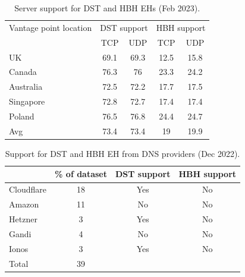 \documentclass[conference]{IEEEtran}
\begin{document}
\begin{table} 
\centering
\caption{Server support for DST and HBH EHs (Feb 2023). }
\begin{tabular}{p{1.5cm}|cc|cc}
\multicolumn{1}{l|}{\centering Vantage point location} & \multicolumn{2}{p{2cm}|}{\centering DST support} 
                      & \multicolumn{2}{p{2cm}}{\centering HBH support} \\ \cline{2-5} 
\multicolumn{1}{l|}{} & \multicolumn{1}{c|}{TCP}   & UDP      & \multicolumn{1}{c|}{TCP}     & UDP   \\ \hline \hline
UK                    & \multicolumn{1}{c|}{69.1}  & 69.3     & \multicolumn{1}{c|}{12.5}    & 15.8  \\ \hline
Canada                & \multicolumn{1}{c|}{76.3}  & 76       & \multicolumn{1}{c|}{23.3}    & 24.2  \\ \hline
Australia             & \multicolumn{1}{c|}{72.5}  & 72.2     & \multicolumn{1}{c|}{17.7}    & 17.5  \\ \hline
Singapore             & \multicolumn{1}{c|}{72.8}  & 72.7     & \multicolumn{1}{c|}{17.4}    & 17.4  \\ \hline
Poland                & \multicolumn{1}{c|}{76.5}  & 76.8     & \multicolumn{1}{c|}{24.4}    & 24.7   \\ \hline
\hline
Avg                & \multicolumn{1}{c|}{73.4}  & 73.4     & \multicolumn{1}{c|}{19}    & 19.9   

\end{tabular}
\label{tbl:e2e_traversal}
\end{table}


\begin{table} 
\centering
\caption{Support for DST and HBH EH from DNS providers (Dec 2022).}
\begin{tabular}{l|c|c|c}
           & \% of dataset &  DST support & HBH support\\
\hline \hline
Cloudflare & 18   & Yes  & No                 \\
\hline
Amazon     & 11   & No   & No                 \\
\hline
Hetzner    & 3    & Yes  & No                 \\
\hline
Gandi      & 4    & No   & No                 \\
\hline
Ionos      & 3    & Yes  & No                 \\
\hline \hline
Total      & 39
\end{tabular}
\label{tbl:provider_support}
\end{table}
\end{document}
